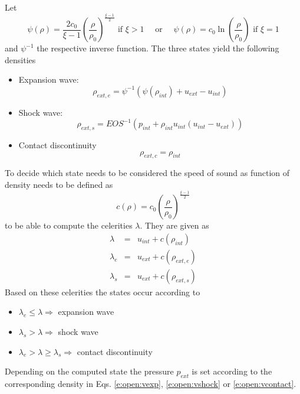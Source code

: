 \documentclass{../GPUSPHtemplate}
\begin{document}
Let
\begin{equation}
\psi(\rho) = \frac{2 c_0}{\xi - 1}\left( \frac{\rho}{\rho_0}
\right)^{\frac{\xi-1}{2}}\mbox{ if } \xi > 1 \quad \mbox{ or } \quad
\psi(\rho) = c_0 \ln\left( \frac{\rho}{\rho_0} \right) \mbox{ if } \xi =
1
\label{e:open:psi}
\end{equation}
and $\psi^{-1}$ the respective inverse function. The three states yield
the following densities
\begin{itemize}
  \item Expansion wave:
  \begin{equation}
  \rho_{ext,e} = \psi^{-1}(\psi(\rho_{int}) +
  u_{ext} - u_{int})
  \label{e:open:vexp}
  \end{equation}
  \item Shock wave:
  \begin{equation}
  \rho_{ext,s} = EOS^{-1}(p_{int} + \rho_{int}
  u_{int} (u_{int} - u_{ext}))
  \label{e:open:vshock}
  \end{equation}
  \item Contact discontinuity
  \begin{equation}
  \rho_{ext,c} = \rho_{int}
  \label{e:open:vcontact}
  \end{equation}
\end{itemize}
To decide which state needs to be considered the speed of sound as
function of density needs to be defined as
\begin{equation}
c(\rho) = c_0 \left( \frac{\rho}{\rho_0} \right)^{\frac{\xi - 1}{2}}
\label{e:open:speedofsound}
\end{equation}
to be able to compute the celerities $\lambda$. They are given as
\begin{eqnarray}
\lambda &=& u_{int} + c(\rho_{int})
\label{e:open:lambda}
\\
\lambda_e &=& u_{ext} + c(\rho_{ext,e})
\label{e:open:vlambda_e}
\\
\lambda_s &=& u_{ext} + c(\rho_{ext,s})
\label{e:open:vlambda_s}
\end{eqnarray}
Based on these celerities the states occur according to
\begin{itemize}
  \item $\lambda_e \le \lambda \Rightarrow$ expansion wave
  \item $\lambda_s > \lambda \Rightarrow$ shock wave
  \item $\lambda_e > \lambda \ge \lambda_s \Rightarrow$ contact
  discontinuity
\end{itemize}
Depending on the computed state the pressure $p_{ext}$ is set according
to the corresponding density in Eqs. \eqref{e:open:vexp},
\eqref{e:open:vshock} or \eqref{e:open:vcontact}.
\end{document}
